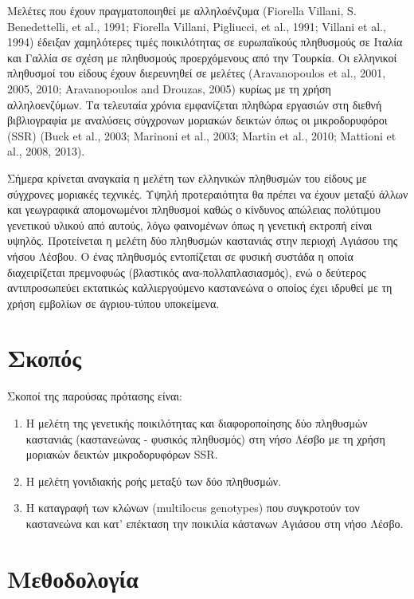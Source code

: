 \documentclass[12pt,a4paper,]{report}
\begin{document}
Μελέτες που έχουν πραγματοποιηθεί με αλληλοένζυμα (Fiorella Villani, S.
Benedettelli, et al., 1991; Fiorella Villani, Pigliucci, et al., 1991;
Villani et al., 1994) έδειξαν χαμηλότερες τιμές ποικιλότητας σε
ευρωπαϊκούς πληθυσμούς σε Ιταλία και Γαλλία σε σχέση με πληθυσμούς
προερχόμενους από την Τουρκία. Οι ελληνικοί πληθυσμοί του είδους έχουν
διερευνηθεί σε μελέτες (Aravanopoulos et al., 2001, 2005, 2010;
Aravanopoulos and Drouzas, 2005) κυρίως με τη χρήση αλληλοενζύμων. Τα
τελευταία χρόνια εμφανίζεται πληθώρα εργασιών στη διεθνή βιβλιογραφία με
αναλύσεις σύγχρονων μοριακών δεικτών όπως οι μικροδορυφόροι (SSR) (Buck
et al., 2003; Marinoni et al., 2003; Martin et al., 2010; Mattioni et
al., 2008, 2013).

Σήμερα κρίνεται αναγκαία η μελέτη των ελληνικών πληθυσμών του είδους με
σύγχρονες μοριακές τεχνικές. Υψηλή προτεραιότητα θα πρέπει να έχουν
μεταξύ άλλων και γεωγραφικά απομονωμένοι πληθυσμοί καθώς ο κίνδυνος
απώλειας πολύτιμου γενετικού υλικού από αυτούς, λόγω φαινομένων όπως η
γενετική εκτροπή είναι υψηλός. Προτείνεται η μελέτη δύο πληθυσμών
καστανιάς στην περιοχή Αγιάσου της νήσου Λέσβου. Ο ένας πληθυσμός
εντοπίζεται σε φυσική συστάδα η οποία διαχειρίζεται πρεμνοφυώς
(βλαστικός ανα-πολλαπλασιασμός), ενώ ο δεύτερος αντιπροσωπεύει εκτατικώς
καλλιεργούμενο καστανεώνα ο οποίος έχει ιδρυθεί με τη χρήση εμβολίων σε
άγριου-τύπου υποκείμενα.

\section{Σκοπός}

Σκοποί της παρούσας πρότασης είναι:

\begin{enumerate}
\def\labelenumi{\arabic{enumi}.}
\item
  Η μελέτη της γενετικής ποικιλότητας και διαφοροποίησης δύο πληθυσμών
  καστανιάς (καστανεώνας - φυσικός πληθυσμός) στη νήσο Λέσβο με τη χρήση
  μοριακών δεικτών μικροδορυφόρων SSR.
\item
  Η μελέτη γονιδιακής ροής μεταξύ των δύο πληθυσμών.
\item
  Η καταγραφή των κλώνων (multilocus genotypes) που συγκροτούν τον
  καστανεώνα και κατ' επέκταση την ποικιλία κάστανων Αγιάσου στη νήσο
  Λέσβο.
\end{enumerate}

\section{Μεθοδολογία}
\end{document}
